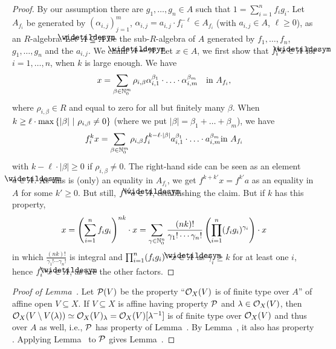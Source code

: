 \documentclass[a4paper,parskip=half,numbers=enddot, DIV=12]{scrreprt}
\begin{document}
\begin{proof}
    By our assumption there are $g_1,\ldots,g_n\in A$ such that $1=\sum_{i=1}^n f_ig_i$. Let $A_{f_i}$ be generated by $(\alpha_{i,j})_{j=1}^m$, $\alpha_{i,j} = a_{i,j}\cdot f_i^{-\ell}\in A_{f_i}$ (with $a_{i,j}\in A$, $\ell\geq0$), as an $R$-algebra. Let $\snake A\subseteq A$ be the sub-$R$-algebra of $A$ generated by $f_1,\ldots,f_n$, $g_1,\ldots,g_n$ and the  $a_{i,j}$. We claim $\snake A = A$. Let $x\in A$, we first show that $f_i^kx \in \snake A$ for $i=1,\ldots, n$, when $k$ is large enough. We have 
    \begin{align*}
        x = \sum_{\beta \in \mathbb{N}_0^m} \rho_{i,\beta} \alpha_{i,1}^{\beta_1}\cdot\ldots\cdot \alpha_{i,m}^{\beta_m}\quad\text{in }A_{f_i}\text{,}
    \end{align*}
    where $\rho_{i,\beta}\in R$ and equal to zero for all but finitely many $\beta$. When $k\geq \ell\cdot \max\left\{|\beta|\ \middle|\  \rho_{i,\beta}\neq 0\right\}$ (where we put $|\beta|=\beta_1+\ldots+\beta_m$), we have
    \begin{align*}
        f_i^kx = \sum_{\beta \in \mathbb{N}_0^m} \rho_{i,\beta}f_i^{k-\ell\cdot|\beta|} a_{i,1}^{\beta_1}\cdot\ldots\cdot a_{i,m}^{\beta_m}\text{in }A_{f_i}
    \end{align*}
    with $k-\ell\cdot|\beta|\geq 0$ if $\rho_{i,\beta}\neq 0$. The right-hand side can be seen as an element $a\in\snake{A}$. As this is (only) an equality in $A_{f_i}$, we get $f^{k+k'}x=f^{k'}a$ as an equality in $A$ for some $k'\geq0$. But still, $f^{k'}a\in\snake{A}$, establishing the claim. But if $k$ has this property,
    \begin{align*}
        x = \left(\sum_{i=1}^n f_ig_i\right)^{nk}\cdot x= \sum_{\gamma\in\mathbb{N}_0^n} \frac{(nk)!}{\gamma_1!\cdots\gamma_n!} \left(\prod_{i=1}^n (f_ig_i)^{\gamma_i}\right)\cdot x
    \end{align*}
    in which $\frac{(nk)!}{\gamma_1!\cdots\gamma_n!}$ is integral and $\prod_{i=1}^n (f_ig_i)^{\gamma_i}x\in \snake A$ as $\gamma_i\geq k$ for at least one $i$, hence $f_i^{\gamma_i}x\in\snake A$, as are the other factors.
\end{proof}

\begin{proof}[Proof of Lemma~]
    Let $\mathcal{P}(V)$ be the property ``$\mathcal{O}_X(V)$ is of finite type over $A$'' of affine open $V\subseteq X$. If $V\subseteq X$ is affine having property $\mathcal{P}$ and $\lambda\in\mathcal{O}_X(V)$, then $\mathcal{O}_X(V\setminus V(\lambda))\simeq\mathcal{O}_X(V)_\lambda=\mathcal{O}_X(V)[\lambda^{-1}]$ is of finite type over $\mathcal{O}_X(V)$ and thus over $A$ as well, i.e., $\mathcal{P}$ has property \itememph{\alpha} of Lemma~. By Lemma~, it also has property \itememph{\beta}. Applying Lemma~ to $\mathcal{P}$ gives Lemma~.
\end{proof}
\end{document}
